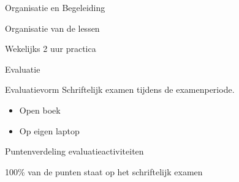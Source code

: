 \documentclass{studiewijzer}
\begin{document}
\showheader

\begin{categorybox}{Organisatie en Begeleiding}
    \begin{category}{Organisatie van de lessen}
        \begin{items}
            \item Wekelijks 2 uur practica
        \end{items}
    \end{category}
\end{categorybox}

\begin{categorybox}{Evaluatie}
    \begin{category}{Evaluatievorm}
        Schriftelijk examen tijdens de examenperiode.
        \begin{itemize}
            \item Open boek
            \item Op eigen laptop
        \end{itemize}
    \end{category}

    \begin{category}{Puntenverdeling evaluatieactiviteiten}
        \begin{items}
            \item 100\% van de punten staat op het schriftelijk examen
        \end{items}
    \end{category}
\end{categorybox}
\end{document}
